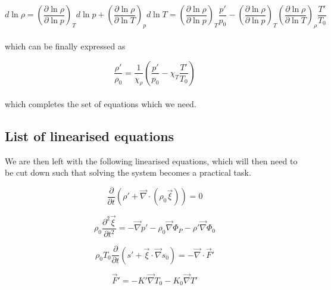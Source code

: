 \documentclass[11pt]{amsart}
\begin{document}
\begin{equation}
d \ln \rho = \left( \frac{\partial \ln \rho}{\partial \ln p} \right)_{T} d \ln p + \left( \frac{\partial \ln \rho}{\partial \ln T} \right)_{p} d \ln T
= \left( \frac{\partial \ln \rho}{\partial \ln p} \right)_{T} \frac{p'}{p_{0}} - \left( \frac{\partial \ln \rho}{\partial \ln p} \right)_{T} \left( \frac{\partial \ln \rho}{\partial \ln T} \right)_{\rho} \frac{T'}{T_{0}}
\end{equation} 
\\
which can be finally expressed as

\begin{equation}
\frac{\rho'}{\rho_{0}}= \frac{1}{\chi_{\rho}} \left( \frac{p'}{p_{0}} - \chi_{T} \frac{T'}{T_{0}} \right)
\end{equation}
\\
which completes the set of equations which we need.






\subsection{List of linearised equations}

We are then left with the following linearised equations, which will then need to be cut down such that solving
the system becomes a practical task.


\begin{equation} \label{eq:cont_lin}
\frac{\partial}{\partial t} \left( \rho' + \vec{\nabla} \cdot \left( \rho_{0} \vec{\xi} \right) \right) = 0
\end{equation}


\begin{equation} \label{eq:mom_lin}
\rho_{0} \frac{\partial^{2} \vec{\xi}}{\partial t^{2}} = - \vec{\nabla} p' - \rho_{0} \vec{\nabla} \Phi_{P}
- \rho' \vec{\nabla} \Phi_{0}
\end{equation}

\begin{equation} \label{eq:E_lin}
\rho_{0} T_{0} \frac{\partial}{\partial t} \left( s' + \vec{\xi} \cdot \vec{\nabla} s_{0} \right)
= - \vec{\nabla} \cdot \vec{F}'
\end{equation}


\begin{equation} \label{eq:F_lin}
\vec{F}' = - K' \vec{\nabla} T_{0} - K_{0} \vec{\nabla} T'
\end{equation}
\end{document}
